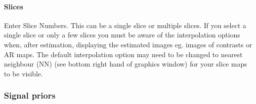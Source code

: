 \paragraph{Slices}

Enter Slice Numbers. This can be a single slice or multiple slices. If you select a single slice or only a few slices you must be aware of the interpolation options when, after estimation, displaying the estimated images eg. images of contrasts or AR maps. The default interpolation option may need to be changed to nearest neighbour (NN) (see bottom right hand of graphics window) for your slice maps to be visible.

\subsubsection{Signal priors}


